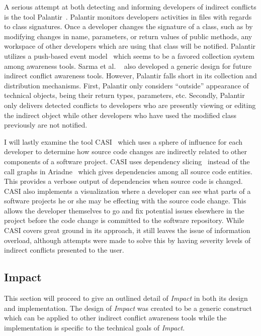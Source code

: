 A serious attempt at both detecting and informing developers of
indirect conflicts is the tool Palantir~\cite{Sarma:2007:TSA}. Palantir
monitors developers activities in files with regards to class signatures.
Once a developer changes the signature of a class, such as by modifying changes
in name, parameters, or return values of public methods, any workspace
of other developers which are using that class will be notified. Palantir utilizes
a push-based event model~\cite{Fitzpatrick:2002:SPA} which seems to be
a favored collection system among awareness tools. Sarma et al.
~\cite{Sarma:2007:TSA} also
developed a generic design for future indirect conflict awareness tools. 
However, Palantir falls short in its collection and distribution
mechanisms. First, Palantir only considers ``outside'' appearance of technical
objects, being their return types, parameters, etc. Secondly, Palantir 
only delivers
detected conflicts to developers who are presently viewing or editing
the indirect object while other developers who have used the modified 
class previously are not notified.

I will lastly examine the tool CASI~\cite{Servant:2010:CPI} which uses
a sphere of influence for each developer to determine how source code
changes are indirectly related to other components of a software project.
CASI uses dependency slicing~\cite{Bajracharya:2009:SIS} instead of the 
call graphs in Ariadne~\cite{Trainer:2005:BGT} which gives dependencies among
all source code entities. This provides a verbose output of dependencies when
source code is changed. CASI also implements a visualization where
a developer can see what parts of a software projects he or she may be effecting
with the source code change. This allows the developer themselves to go and fix
potential issues elsewhere in the project before the code change is committed
to the software repository. While CASI covers great ground in its approach,
it still leaves the issue of information overload, although attempts were made
to solve this by having severity levels of indirect conflicts presented to
the user.

\subsection{Impact}
This section will proceed to give an outlined detail of \textit{Impact} in both its
design and implementation. The design of \textit{Impact} was created to be
a generic construct which can be applied to other indirect conflict 
awareness tools while the implementation is specific to the technical
goals of \textit{Impact}.

